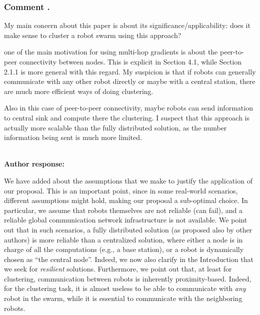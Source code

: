 \documentclass{article}
\newcounter{reviewer}
\newcounter{comment}[reviewer]
\newcommand{\commentl}[2]{
	\subsubsection*{\refstepcounter{comment}\label{#1}Comment \arabic{reviewer}.\arabic{comment}} %
	\colorbox{gray!10}{\parbox[t]{\linewidth}{ #2 }}
}
\newcommand{\reply}[1]{	\\[2pt]
	\textbf{Author response:}
	#1
}
\newcommand{\related}[1]{	\\[2pt]
	\textbf{Related comments:}
	\ref{#1}
}
\newcommand{\meta}[1]{{\color{blue}#1}}
\begin{document}
\commentl{r1-applicability}{
	My main concern about this paper is about its significance/applicability: does it make sense to cluster a robot swarm using this approach?

	one of the main motivation for using multi-hop gradients is about the peer-to-peer connectivity between nodes.
	This is explicit in Section 4.1, while Section 2.1.1 is more general with this regard.
 My suspicion is that if robots can generally communicate with any other robot directly or maybe with a central station, there are much more efficient ways of doing clustering.

	Also in this case of peer-to-peer connectivity,
	maybe robots can send information to central sink and compute there the clustering.
	I suspect that this approach is actually more scalable than the fully distributed solution,
	as the number information being sent is much more limited.
}
\reply{
  We have added  about the assumptions that we make to justify the application of our proposal.
  This is an important point, since in some real-world scenarios, different  assumptions might hold, making our proposal  a sub-optimal choice.
  In particular, we assume that robots themselves are not reliable (can fail), and a reliable global communication network infrastructure is not available.
  We point out that in such scenarios, a fully distributed solution (as proposed also by other authors) is more reliable than a centralized solution, where either a node is in charge of all the computations (e.g., a base station), or a robot is dynamically chosen as ``the central node''.
  Indeed, we now also clarify in the Introduction that we seek for \emph{resilient} solutions.
  Furthermore, we point out that, at least for clustering, communication between robots is inherently proximity-based. Indeed, for the clustering task, it is almost useless to be able to communicate with {\em any} robot in the swarm, while it is essential to communicate with the neighboring robots.
}
\end{document}
